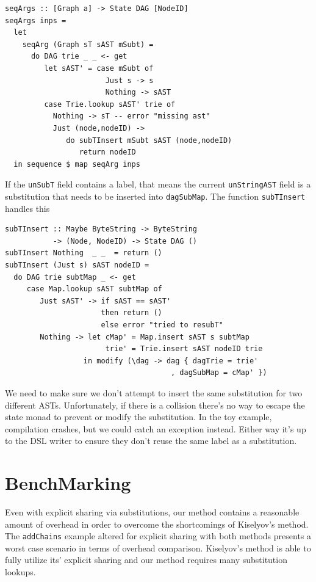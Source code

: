 \documentclass[runningheads]{llncs}
\begin{document}
\begin{verbatim}
seqArgs :: [Graph a] -> State DAG [NodeID]
seqArgs inps =
  let
    seqArg (Graph sT sAST mSubt) =
      do DAG trie _ _ <- get
         let sAST' = case mSubt of
                       Just s -> s
                       Nothing -> sAST
         case Trie.lookup sAST' trie of
           Nothing -> sT -- error "missing ast"
           Just (node,nodeID) ->
              do subTInsert mSubt sAST (node,nodeID)
                 return nodeID
  in sequence $ map seqArg inps
\end{verbatim}

If the \texttt{unSubT} field contains a label, that means the
current \texttt{unStringAST} field is a substitution that needs to
be inserted into \texttt{dagSubMap}. The function
\texttt{subTInsert} handles this

\begin{verbatim}
subTInsert :: Maybe ByteString -> ByteString
           -> (Node, NodeID) -> State DAG ()
subTInsert Nothing  _ _  = return ()
subTInsert (Just s) sAST nodeID =
  do DAG trie subtMap _ <- get
     case Map.lookup sAST subtMap of
        Just sAST' -> if sAST == sAST'
                      then return ()
                      else error "tried to resubT"
        Nothing -> let cMap' = Map.insert sAST s subtMap
                       trie' = Trie.insert sAST nodeID trie
                  in modify (\dag -> dag { dagTrie = trie'
                                      , dagSubMap = cMap' })
\end{verbatim}

We need to make sure we don't attempt to insert the same substitution for two
different ASTs. Unfortunately, if there is a collision there's no way to escape
the state monad to prevent or modify the substitution. In the toy example,
compilation crashes, but we could catch an exception instead. Either way it's up
to the DSL writer to ensure they don't reuse the same label as a substitution.

\section{BenchMarking}

Even with explicit sharing via substitutions, our method contains a reasonable
amount of overhead in order to overcome the shortcomings of Kiselyov's method.
The \texttt{addChains} example altered for explicit sharing with
both methods presents a worst case scenario in terms of overhead comparison.
Kiselyov's method is able to fully utilize its' explicit sharing and our method
requires many substitution lookups.
\end{document}
